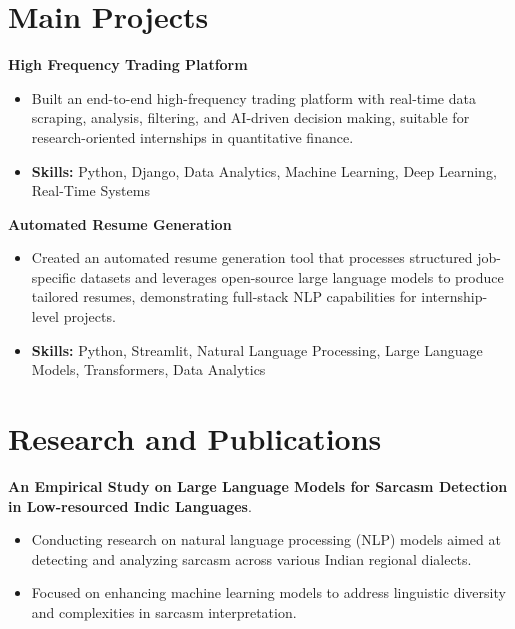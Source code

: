 \documentclass[a4paper,11pt]{article}
\begin{document}
\section{\textbf{Main Projects}}

\vspace{1mm}
  \textbf{High Frequency Trading Platform  }
\vspace{-1.5mm} %
\begin{itemize}
  \item Built an end-to-end high-frequency trading platform with real-time data scraping, analysis, filtering, and AI-driven decision making, suitable for research-oriented internships in quantitative finance.
\vspace{-3mm}
  \item \textbf{Skills:} Python, Django, Data Analytics, Machine Learning, Deep Learning, Real-Time Systems
\end{itemize}


\vspace{1mm}
   \textbf{Automated Resume Generation }
\vspace{-1.5mm} %
\begin{itemize}
  \item Created an automated resume generation tool that processes structured job-specific datasets and leverages open-source large language models to produce tailored resumes, demonstrating full-stack NLP capabilities for internship-level projects.
\vspace{-3mm}
  \item \textbf{Skills:} Python, Streamlit, Natural Language Processing, Large Language Models, Transformers, Data Analytics
\end{itemize}



\section{\textbf{Research and Publications} \hfill }
\vspace{1mm}
  \textbf{An Empirical Study on Large Language Models for Sarcasm Detection in Low-resourced Indic Languages}.
\vspace{-1mm} %
\begin{itemize}
  \item Conducting research on natural language processing (NLP) models aimed at detecting and analyzing sarcasm across various Indian regional dialects.
\vspace{-3mm}
  \item Focused on enhancing machine learning models to address linguistic diversity and complexities in sarcasm interpretation.
\end{itemize}
\end{document}
